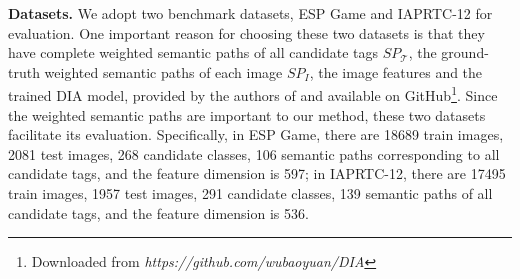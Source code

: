 \documentclass[10pt,twocolumn,letterpaper]{article}
\begin{document}
\noindent
{\bf Datasets.} 
We adopt two benchmark datasets, ESP Game \cite{espgame-2004} and IAPRTC-12 \cite{iaprtc-12-data-2006} for evaluation. One important reason for choosing these two datasets is that they have complete weighted semantic paths of all candidate tags $SP_{\mathcal{T}}$, the ground-truth weighted semantic paths of each image $SP_{I}$, the image features and the trained DIA model, provided by the authors of \cite{my-cvpr-2017-dia} and available on GitHub\footnote{Downloaded from {\it https://github.com/wubaoyuan/DIA}}. 
%
Since the weighted semantic paths are important to our method, these two datasets facilitate its evaluation.
Specifically, in ESP Game, there are 18689 train images, 2081 test images, 268 candidate classes, 106 semantic paths corresponding to all candidate tags, and the feature dimension is 597; in IAPRTC-12, there are 17495 train images, 1957 test images, 291 candidate classes, 139 semantic paths of all candidate tags, and the feature dimension is 536.
\end{document}
